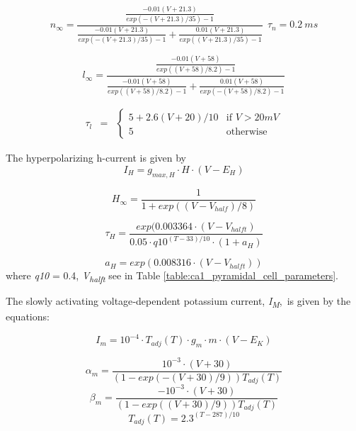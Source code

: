 \documentclass[a4paper,12pt]{article}
\begin{document}
\begin{equation}
n_{\infty} = \frac{\frac{-0.01(V+21.3)}{exp(-(V+21.3)/35)-1}}{\frac{-0.01(V+21.3)}{exp(-(V+21.3)/35)-1} + \frac{0.01(V+21.3)}{exp( (V+21.3)/35)-1} } \ \ \tau_n=0.2 \ ms
\end{equation}

\begin{equation}
l_{\infty} = \frac{\frac{-0.01(V+58)}{exp( (V+58)/8.2)-1}}{\frac{-0.01(V+58)}{exp( (V+58)/8.2)-1} + \frac{0.01(V+58)}{exp(-(V+58)/8.2)-1}}
\end{equation}

\begin{equation}
\begin{matrix}
\tau_l & =
& \left\{
\begin{matrix}
5+2.6(V+20)/10 & \mbox{if } V > 20 mV \\
5 & \mbox{otherwise }
\end{matrix} \right.
\end{matrix}
\end{equation}


The hyperpolarizing h-current is given by
\begin{equation}
I_H=g_{max, H} \cdot H \cdot (V-E_H)
\end{equation}

\begin{equation}
H_{\infty }=\frac {1}{1+exp((V-V_{half})/8)}  
\end{equation}

\begin{equation}
\tau_{H}=\frac{exp( 0.003364\cdot
	(V-V_{halft})}{0.05 \cdot q10^{(T-33)/10} \cdot
	(1+a_{H})}
\end{equation}


\begin{equation}
a_{H}=exp( 0.008316 \cdot (V-V_{halft}))
\end{equation}
where \textit{q10} =  0.4, \textit{V\textsubscript{halft}}
see in Table \ref{table:ca1_pyramidal_cell_parameters}.

The slowly activating voltage‑dependent potassium current, \textit{I}\textit{\textsubscript{M}},~is given by the
equations:


\begin{equation}
I_m=10^{-4}\cdot T_{adj}(T)\cdot g_m\cdot m\cdot
(V-E_K)
\end{equation}


\begin{equation}
\alpha_m =  \frac{10^{-3}\cdot(V+30)}{(1-exp(-(V+30)/9))T_{adj}(T)} 
\end{equation}
\begin{equation}
\beta_m = \frac{ -10^{-3}\cdot(V+30)}{(1-exp((V+30)/9))T_{adj}(T)}
\end{equation}
\begin{equation}
T_{adj}(T)=2.3^{(T - 287)/10}
\end{equation}
\end{document}
